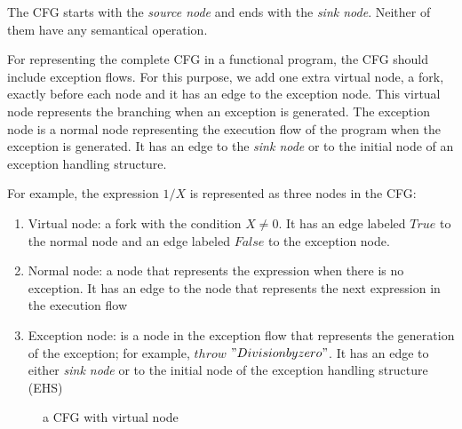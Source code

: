 \documentclass[12pt,a4paper]{report}
\begin{document}
The CFG starts with the \emph{source node} and ends with the \emph{sink node}. Neither of them have any semantical operation.

For representing the complete CFG in a functional program, the CFG should include exception flows. For this purpose, we add one extra virtual node, a fork, exactly before each node and it has an edge to the exception node. This virtual node represents the branching when an exception is generated. The exception node is a normal node representing the execution flow of the program when the exception is generated. It has an edge to the \emph{sink node} or to the initial node of an exception handling structure. 

For example, the expression $1/X$ is represented as three nodes in the CFG:
\begin{enumerate}
 \item Virtual node: a fork with the condition $X\neq0$. It has an edge labeled $True$ to the normal node and an edge labeled $False$ to the exception node.
 \item Normal node: a node that represents the expression when there is no exception. It has an edge to the node that represents the next expression in the execution flow
 \item Exception node: is a node in the exception flow that represents the generation of the exception; for example, $throw$ $"Division by zero"$. It has an edge to either \emph{sink node} or to the initial node of the exception handling structure (EHS)
\end{enumerate}
 \begin{center}
\begin{figure}
\centering
\caption{a CFG with virtual node}
\label{fig:virtualnode}
\end{figure}
 \end{center}
\end{document}
